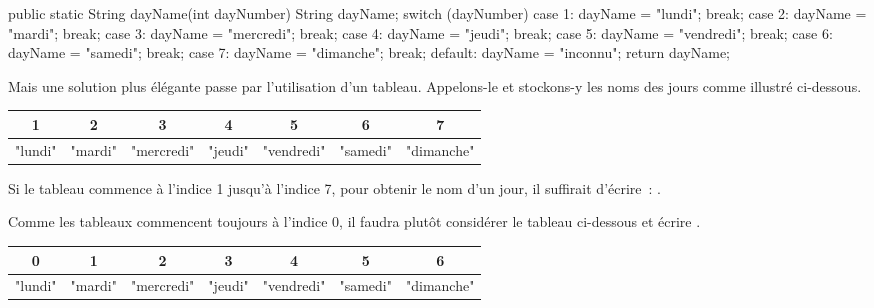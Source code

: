 		\begin{java}
public static String dayName(int dayNumber){
	String dayName;
	switch (dayNumber){
		case 1:
			dayName = "lundi";
			break;
		case 2:
			dayName = "mardi";
			break;
		case 3:
			dayName = "mercredi";
			break;
		case 4:
			dayName = "jeudi";
			break;
		case 5:
			dayName = "vendredi";
			break;
		case 6:
			dayName = "samedi";
			break;
		case 7:
			dayName = "dimanche";
			break;
		default:
			dayName = "inconnu";
	}
	return dayName;
}
		\end{java}

		Mais une solution plus élégante passe par l’utilisation d’un tableau.
		Appelons-le  et stockons-y les noms des jours
		comme illustré ci-dessous.

		\begin{center}
			\footnotesize
			\begin{tabular}{ccccccc}
				1 & 2 & 3 & 4 & 5 & 6 & 7
				\\\hline
				\multicolumn{1}{|c|}{"lundi"} &
				\multicolumn{1}{c|}{"mardi"} &
				\multicolumn{1}{c|}{"mercredi"} &
				\multicolumn{1}{c|}{"jeudi"} &
				\multicolumn{1}{c|}{"vendredi"} &
				\multicolumn{1}{c|}{"samedi"} &
				\multicolumn{1}{c|}{"dimanche"}
				\\\hline
			\end{tabular}
		\end{center}


		Si le tableau commence à l'indice 1 jusqu'à l'indice 7, pour obtenir le
		nom d’un jour, il suffirait d’écrire~: .
		
		Comme les tableaux commencent toujours à l'indice 0, il faudra plutôt
		considérer le tableau ci-dessous et écrire .
		
		\begin{center}
			\footnotesize
			\begin{tabular}{ccccccc}
				0 &1 & 2 & 3 & 4 & 5 & 6 
				\\\hline
				\multicolumn{1}{|c|}{"lundi"} &
				\multicolumn{1}{c|}{"mardi"} &
				\multicolumn{1}{c|}{"mercredi"} &
				\multicolumn{1}{c|}{"jeudi"} &
				\multicolumn{1}{c|}{"vendredi"} &
				\multicolumn{1}{c|}{"samedi"} &
				\multicolumn{1}{c|}{"dimanche"}
				\\\hline
			\end{tabular}
		\end{center}

		
		
